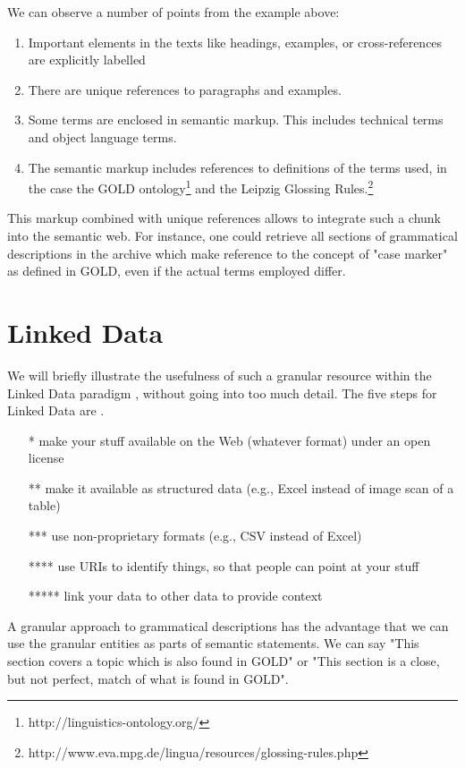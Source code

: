 \documentclass[a4paper,10pt]{article}
\begin{document}
We can observe a number of points from the example above:

\begin{enumerate}
 \item Important elements in the texts like headings, examples, or cross-references are explicitly labelled
 \item There are unique references to paragraphs and examples.
 \item Some terms are enclosed in semantic markup. This includes technical terms and object language terms.
 \item The semantic markup includes references to definitions of the terms used, in the case the GOLD ontology\footnote{http://linguistics-ontology.org/} and the Leipzig Glossing Rules.\footnote{http://www.eva.mpg.de/lingua/resources/glossing-rules.php}
\end{enumerate}

This markup combined with unique references allows to integrate such a chunk into the semantic web. For instance, one could retrieve all sections of grammatical descriptions in the archive which make reference to the concept of "case marker" as defined in GOLD, even if the actual terms employed differ.
 
\section{Linked Data}
We will briefly illustrate the usefulness of such a granular resource within the Linked Data paradigm \citep{HeathEtAl2011}, without going into too much detail. The five steps for Linked Data are \citep{BernersLee2006}.

\begin{itemize}
 \item[*]       make your stuff available on the Web (whatever format) under an open license
 \item[**]	make it available as structured data (e.g., Excel instead of image scan of a table)
 \item[***]	use non-proprietary formats (e.g., CSV instead of Excel)
 \item[****]	use URIs to identify things, so that people can point at your stuff
 \item[*****]	link your data to other data to provide context
\end{itemize}
 
A granular approach to grammatical descriptions has the advantage that we can use the granular entities as parts of semantic statements. We can say "This section covers a topic which is also found in GOLD" or "This section is a close, but not perfect, match of what is found in GOLD".
\end{document}
